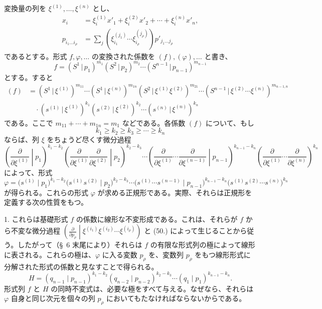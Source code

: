 \documentclass[11pt]{jlreq}
\newcommand{\pair}[2]{(#1\,|\,#2)}
\begin{document}
変換量の列を $\xi^{(1)},\ldots,\xi^{(n)}$ とし、
\begin{equation}
\begin{aligned}
x_i&=\xi_i^{(1)}x'_1+\xi_i^{(2)}x'_2+\cdots+\xi_i^{(n)}x'_n,\\
p_{i_1\ldots i_\rho}&=\sum_j(\xi_{i_1}^{(j_1)}\cdots \xi_{i_\rho}^{(j_\rho)})p'_{j_1\ldots j_\rho}
\end{aligned}
\tag{47}
\end{equation}
であるとする。形式 $f,\varphi,\ldots$ の変換された係数を $(f),(\varphi),\ldots$ と書き、
\[
 f=\pair{S^1}{p_1}^{m_1}\pair{S^2}{p_2}^{m_2}\cdots\pair{S^{n-1}}{p_{n-1}}^{m_{n-1}}
\]
とする。すると
\begin{equation}
\begin{aligned}
(f)&=\pair{S^1}{\xi^{(1)}}^{m_{11}}\cdots\pair{S^1}{\xi^{(n)}}^{m_{1n}}
\pair{S^2}{\xi^{(1)}\xi^{(2)}}^{m_{21}}\cdots
\pair{S^{n-1}}{\xi^{(2)}\cdots\xi^{(n)}}^{m_{n-1,n}}\\
&\quad\cdot\pair{s^{(1)}}{\xi^{(1)}}^{k_1}\pair{s^{(2)}}{\xi^{(2)}}^{k_2}\cdots\pair{s^{(n)}}{\xi^{(n)}}^{k_n}
\end{aligned}
\tag{48}
\end{equation}
である。ここで $m_{11}+\cdots+m_{1n}=m_1$ などである。各係数 $(f)$ について、もし
\begin{equation}
 k_1\ge k_2\ge k_3\ge\cdots\ge k_n
\tag{49}
\end{equation}
ならば、列 $\xi$ をちょうど尽くす微分過程
\begin{equation}
\left(\frac{\partial}{\partial\xi^{(1)}}\middle|p_1\right)^{k_1-k_2}
\left(\frac{\partial}{\partial\xi^{(1)}}\frac{\partial}{\partial\xi^{(2)}}\middle|p_2\right)^{k_2-k_3}
\cdots
\left(\frac{\partial}{\partial\xi^{(1)}}\cdots\frac{\partial}{\partial\xi^{(n-1)}}\middle|p_{n-1}\right)^{k_{n-1}-k_n}
\left(\frac{\partial}{\partial\xi^{(1)}}\cdots\frac{\partial}{\partial\xi^{(n)}}\right)^{k_n}
\tag{50}
\end{equation}
によって、形式
\begin{equation}
 \varphi=\bigl(s^{(1)}\mid p_1\bigr)^{k_1-k_2}
 \bigl(s^{(1)}s^{(2)}\mid p_2\bigr)^{k_2-k_3}\cdots
 \bigl(s^{(1)}\cdots s^{(n-1)}\mid p_{n-1}\bigr)^{k_{n-1}-k_n}
 \bigl(s^{(1)}s^{(2)}\cdots s^{(n)}\bigr)^{k_n}
\tag{51}
\end{equation}
が得られる。これらの形式 $\varphi$ が求める正規形である。実際、それらは正規形を定義する次の性質をもつ。

1. これらは基礎形式 $f$ の係数に線形な不変形成である。これは、それらが $f$ から不変な微分過程 $\left(\frac{\partial}{\partial p_\rho}\middle|\xi^{(i_1)}\xi^{(i_2)}\cdots\xi^{(i_\rho)}\right)$ と (50.) によって生じることから従う。したがって（\S\ 6 末尾により）それらは $f$ の有限な形式列の極によって線形に表される。これらの極は、$\varphi$ に入る変数 $p_\rho$ を、変数列 $p_\rho$ をもつ線形形式に分解された形式の係数と見なすことで得られる。
\begin{equation}
 H=(q_{n-1}\mid p_{n-1})^{k_1-k_2}(q_{n-2}\mid p_{n-2})^{k_2-k_3}\cdots(q_1\mid p_1)^{k_{n-1}-k_n}.
\tag{52}
\end{equation}
形式列 $f$ と $H$ の同時不変式は、必要な極をすべて与える。なぜなら、それらは $\varphi$ 自身と同じ次元を個々の列 $p_\rho$ においてもたなければならないからである。
\end{document}
